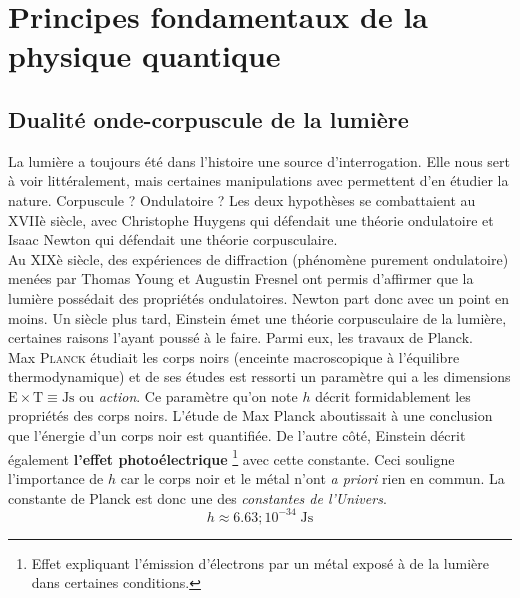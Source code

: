 \documentclass[12pt, a4paper]{book}
\author{Sami \textsc{Abdul Sater}}
\date{\hspace{-0cm}Année académique 2020-2021}
\begin{document}
\pretitle{\begin{flushleft} \fontsize{30}{34}\selectfont}
\posttitle{\end{flushleft}}
\preauthor{\begin{flushleft} \linespread{1.4} \large}
\postauthor{\end{flushleft}}
\predate{} %
\postdate{} %

\maketitle
\vfill


\thispagestyle{empty}
\restoregeometry
\tableofcontents
\chapter{Principes fondamentaux de la physique quantique}

\section{Dualité onde-corpuscule de la lumière}
La lumière a toujours été dans l'histoire une source d'interrogation. Elle nous sert à voir littéralement, mais certaines manipulations avec permettent d'en étudier la nature. Corpuscule ? Ondulatoire ? Les deux hypothèses se combattaient au XVIIè siècle, avec Christophe Huygens qui défendait une théorie ondulatoire et Isaac Newton qui défendait une théorie corpusculaire. \\

Au XIXè siècle, des expériences de diffraction (phénomène purement ondulatoire) menées par Thomas Young et Augustin Fresnel ont permis d'affirmer que la lumière possédait des propriétés ondulatoires. Newton part donc avec un point en moins. Un siècle plus tard, Einstein émet une théorie corpusculaire de la lumière, certaines raisons l'ayant poussé à le faire. Parmi eux, les travaux de Planck. \\

Max \textsc{Planck} étudiait les corps noirs (enceinte macroscopique à l'équilibre thermodynamique) et de ses études est ressorti un paramètre qui a les dimensions $\mathrm{E} \times \mathrm{T} \equiv \mathrm{Js}$ ou \textit{action}. Ce paramètre qu'on note $h$ décrit formidablement les propriétés des corps noirs. L'étude de Max Planck aboutissait à une conclusion que l'énergie d'un corps noir est quantifiée. De l'autre côté, Einstein décrit également \textbf{l'effet photoélectrique} \footnote{Effet expliquant l'émission d'électrons par un métal exposé à de la lumière dans certaines conditions.} avec cette constante. Ceci souligne l'importance de $h$ car le corps noir et le métal n'ont \textit{a priori} rien en commun. La constante de Planck est donc une des \textit{constantes de l'Univers}.
$$h \approx 6.63 ; 10^{-34} \; \mathrm{Js}$$
\end{document}

